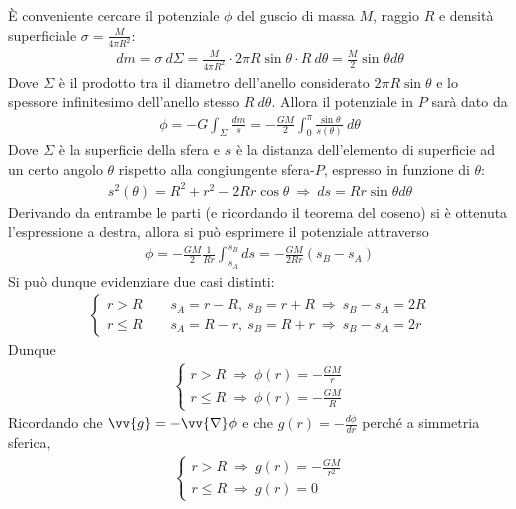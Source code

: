 \documentclass[a4paper, oneside]{book}
\begin{document}
È conveniente cercare il potenziale $\phi$ del guscio di massa $M$, raggio $R$ e densità 
superficiale $\sigma = \frac{M}{4\pi R^{2}}$:
\begin{align*}
    dm = \sigma \ d\Sigma = \frac{M}{4\pi R^{2}} \cdot 2\pi R\sin\theta \cdot R\ d\theta = \frac{M}{2} \sin\theta d\theta
\end{align*}
Dove $\Sigma$ è il prodotto tra il diametro dell'anello considerato $2\pi R\sin\theta$ e lo spessore 
infinitesimo dell'anello stesso $R\ d\theta$. Allora il potenziale in $P$ sarà dato da
\begin{gather*}
    \phi = - G\int_{\Sigma} \frac{dm}{s} = - \frac{GM}{2} \int_{0}^{\pi} \frac{\sin\theta}{s(\theta)}  \ d\theta
\end{gather*}
Dove $\Sigma$ è la superficie della sfera e $s$ è la distanza dell'elemento di superficie 
ad un certo angolo $\theta$ rispetto alla congiungente sfera-$P$, espresso in funzione di $\theta$:
\begin{gather*}
    s^{2}(\theta) = R^{2} + r^{2} - 2Rr\cos\theta \ \Longrightarrow \  ds = Rr\sin\theta d\theta
\end{gather*}
Derivando da entrambe le parti (e ricordando il teorema del coseno) si è ottenuta l'espressione a destra, allora
si può esprimere il potenziale attraverso 
\begin{gather*}
    \phi = -\frac{GM}{2}\frac{1}{Rr} \int_{s_A}^{s_B} ds = - \frac{GM}{2Rr}(s_B - s_A) 
\end{gather*}
Si può dunque evidenziare due casi distinti:
\begin{gather*}
    \left\{\begin{array}{l}
        r > R \qquad s_A = r - R, \  s_B = r + R \ \Longrightarrow \ s_B - s_A = 2R \\
        r \leq R \qquad s_A = R - r, \ s_B = R + r \ \Longrightarrow \ s_B - s_A = 2r
    \end{array}\right.
\end{gather*}
Dunque
\begin{gather*}
    \left\{\begin{array}{l}
        r > R \ \Longrightarrow \ \phi(r) = - \frac{GM}{r} \\
        r \leq R \ \Longrightarrow \ \phi(r) = - \frac{GM}{R}
    \end{array}\right.
\end{gather*}
Ricordando che $\vv{g} = -\vv{\nabla}\phi$ e che $g(r) = -\frac{d\phi}{dr}$ perché a simmetria sferica, 
\begin{gather*}
    \left\{\begin{array}{l}
        r > R \ \Longrightarrow \ g(r) = - \frac{GM}{r^{2}} \\
        r \leq R \ \Longrightarrow \ g(r) = 0
    \end{array}\right.
\end{gather*}  
\end{document}
